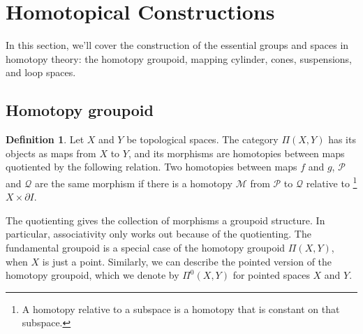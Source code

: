 \documentclass[12pt, notitlepage]{article}
\theoremstyle{definition}
\newtheorem{defn}{Definition}[section]
\begin{document}
\section{Homotopical Constructions}
In this section, we'll cover the construction of the essential groups
and spaces in homotopy theory: the homotopy groupoid, mapping
cylinder, cones, suspensions, and loop spaces.

\subsection{Homotopy groupoid}
\begin{defn}
  Let $X$ and $Y$ be topological spaces. The category $\Pi(X,Y)$ has
  its objects as maps from $X$ to $Y$, and its morphisms are
  homotopies between maps quotiented by the following relation. Two
  homotopies between maps $f$ and $g$, $\mathcal{P}$ and $\mathcal{Q}$
  are the same morphism if there is a homotopy $\mathcal{M}$ from
  $\mathcal{P}$ to $\mathcal{Q}$ relative to \footnote{A homotopy
    relative to a subspace is a homotopy that is constant on that
    subspace.} $X \times \partial I$.
\end{defn}
The quotienting gives the collection of morphisms a groupoid
structure. In particular, associativity only works out because of the
quotienting. The fundamental groupoid is a special case of the
homotopy groupoid $\Pi(X,Y)$, when $X$ is just a point. Similarly, we
can describe the pointed version of the homotopy groupoid, which we
denote by $\Pi^0(X,Y)$ for pointed spaces $X$ and $Y$.
\end{document}
